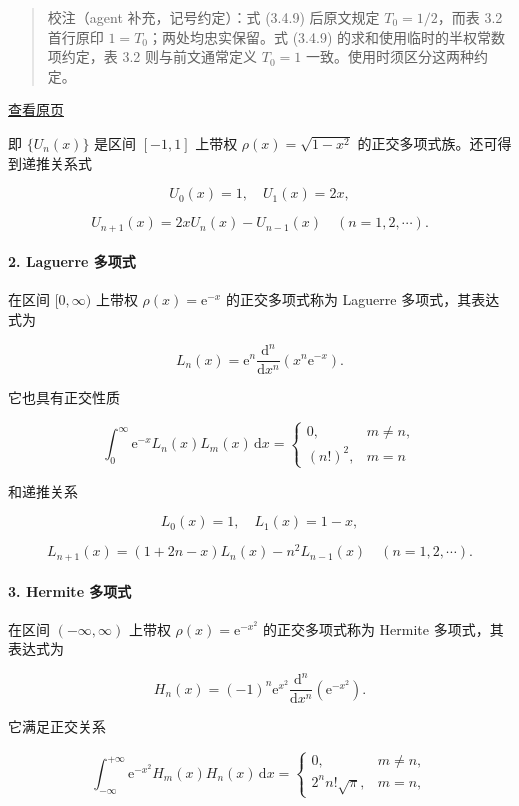 \documentclass[
  10pt,
  fontset=fandol]{ctexart}
\begin{document}
\begin{quote}
校注（agent 补充，记号约定）：式 (3.4.9) 后原文规定 \(T_0=1/2\)，而表 3.2 首行原印 \(1=T_0\)；两处均忠实保留。式 (3.4.9) 的求和使用临时的半权常数项约定，表 3.2 则与前文通常定义 \(T_0=1\) 一致。使用时须区分这两种约定。
\end{quote}

\href{../../source-images/pdf-076.jpeg}{查看原页}

即 \(\{U_n(x)\}\) 是区间 \([-1,1]\) 上带权 \(\rho(x)=\sqrt{1-x^2}\) 的正交多项式族。还可得到递推关系式

\[
U_0(x)=1,\quad U_1(x)=2x,
\]

\[
U_{n+1}(x)=2xU_n(x)-U_{n-1}(x)\quad(n=1,2,\cdots).
\]

\paragraph{2. Laguerre 多项式}\label{laguerre-ux591aux9879ux5f0f}

在区间 \([0,\infty)\) 上带权 \(\rho(x)=\mathrm e^{-x}\) 的正交多项式称为 Laguerre 多项式，其表达式为

\[
L_n(x)=\mathrm e^n\frac{\mathrm d^n}{\mathrm dx^n}(x^n\mathrm e^{-x}).\tag{3.4.11}
\]

它也具有正交性质

\[
\int_0^\infty \mathrm e^{-x}L_n(x)L_m(x)\,\mathrm dx=
\begin{cases}
0,&m\ne n,\\
(n!)^2,&m=n
\end{cases}
\]

和递推关系

\[
L_0(x)=1,\quad L_1(x)=1-x,
\]

\[
L_{n+1}(x)=(1+2n-x)L_n(x)-n^2L_{n-1}(x)\quad(n=1,2,\cdots).
\]

\paragraph{3. Hermite 多项式}\label{hermite-ux591aux9879ux5f0f}

在区间 \((-\infty,\infty)\) 上带权 \(\rho(x)=\mathrm e^{-x^2}\) 的正交多项式称为 Hermite 多项式，其表达式为

\[
H_n(x)=(-1)^n\mathrm e^{x^2}\frac{\mathrm d^n}{\mathrm dx^n}(\mathrm e^{-x^2}).\tag{3.4.12}
\]

它满足正交关系

\[
\int_{-\infty}^{+\infty}\mathrm e^{-x^2}H_m(x)H_n(x)\,\mathrm dx=
\begin{cases}
0,&m\ne n,\\
2^nn!\sqrt\pi,&m=n,
\end{cases}
\]
\end{document}
